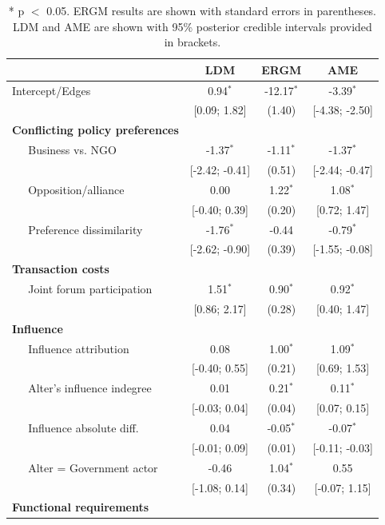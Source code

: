 \documentclass[12pt,twocolumn,twoside]{pnas-new}
\begin{document}
\begin{table}[ht]
\centering
\caption{* p $<$ 0.05. ERGM results are shown with standard errors in parentheses. LDM and AME are shown with 95\% posterior credible intervals provided in brackets.}
\begin{tabular}{lccc}
  & LDM & ERGM & AME \\
  \hline
\hline
Intercept/Edges & 0.94$^{\ast}$ & -12.17$^{\ast}$ & -3.39$^{\ast}$ \\
   & [0.09; 1.82] & (1.40) & [-4.38; -2.50] \\
  \textbf{Conflicting policy preferences}  &  &  &  \\
  $\;\;\;\;$ Business vs. NGO & -1.37$^{\ast}$ & -1.11$^{\ast}$ & -1.37$^{\ast}$ \\
   & [-2.42; -0.41] & (0.51) & [-2.44; -0.47] \\
  $\;\;\;\;$ Opposition/alliance  & 0.00 & 1.22$^{\ast}$ & 1.08$^{\ast}$ \\
   & [-0.40; 0.39] & (0.20) & [0.72; 1.47] \\
  $\;\;\;\;$ Preference dissimilarity & -1.76$^{\ast}$ & -0.44 & -0.79$^{\ast}$ \\
   & [-2.62; -0.90] & (0.39) & [-1.55; -0.08] \\
  \textbf{Transaction costs}  &  &  &  \\
  $\;\;\;\;$ Joint forum participation & 1.51$^{\ast}$ & 0.90$^{\ast}$ & 0.92$^{\ast}$ \\
   & [0.86; 2.17] & (0.28) & [0.40; 1.47] \\
  \textbf{Influence}  &  &  &  \\
  $\;\;\;\;$ Influence attribution & 0.08 & 1.00$^{\ast}$ & 1.09$^{\ast}$ \\
   & [-0.40; 0.55] & (0.21) & [0.69; 1.53] \\
  $\;\;\;\;$ Alter's influence indegree & 0.01 & 0.21$^{\ast}$ & 0.11$^{\ast}$ \\
   & [-0.03; 0.04] & (0.04) & [0.07; 0.15] \\
  $\;\;\;\;$ Influence absolute diff. & 0.04 & -0.05$^{\ast}$ & -0.07$^{\ast}$ \\
   & [-0.01; 0.09] & (0.01) & [-0.11; -0.03] \\
  $\;\;\;\;$ Alter = Government actor & -0.46 & 1.04$^{\ast}$ & 0.55 \\
   & [-1.08; 0.14] & (0.34) & [-0.07; 1.15] \\
  \textbf{Functional requirements}  &  &  &  \\

\end{tabular}
\end{table}
\end{document}
